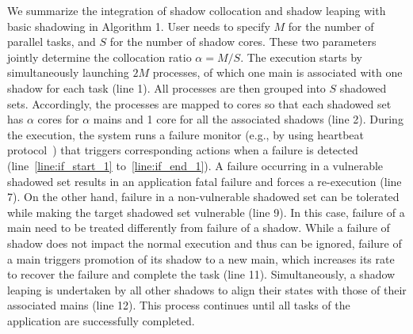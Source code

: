 We summarize the integration of shadow collocation and shadow leaping with basic shadowing in Algorithm 1.
User needs to specify $M$ for the number of parallel tasks, and $S$ for the number of shadow cores. These two parameters jointly determine the collocation ratio $\alpha=M/S$. The execution starts by simultaneously launching $2M$ processes, of which one main is associated with one shadow for each task (line 1). 
All processes are then grouped into $S$ shadowed sets. Accordingly, the processes are mapped to cores so that each shadowed set has $\alpha$ cores for $\alpha$ mains and 1 core for all the associated shadows (line 2). 
During the execution,
the system runs a failure monitor (e.g., by using heartbeat protocol~\cite{1004595}) that triggers corresponding actions when a failure is detected (line~\ref{line:if_start_1} to~\ref{line:if_end_1}). %
A failure occurring in a vulnerable shadowed set results in an application fatal failure %
 and forces a re-execution (line 7).
On the other hand, failure in a non-vulnerable shadowed set
can be tolerated while making the target shadowed set vulnerable (line 9). In this case, failure of a main need to be treated differently from failure of a shadow. While a failure of shadow 
does not impact the normal execution and thus can be ignored, failure of a main %
triggers promotion of its shadow to a new main, which increases its rate to recover the failure and complete the task (line 11). Simultaneously, a shadow leaping is undertaken by all other shadows to align their states with those of their associated mains (line 12).  
This process continues until all tasks of the application are successfully completed.

